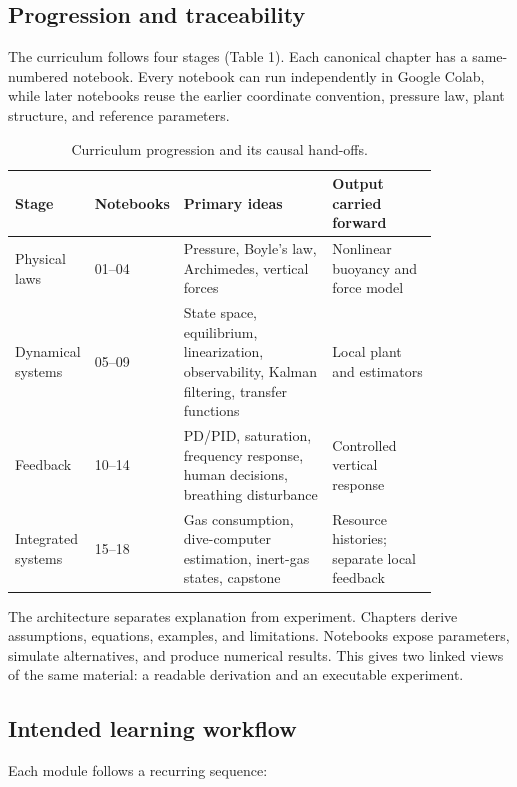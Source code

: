 \documentclass[
]{article}
\begin{document}
\hypertarget{progression-and-traceability}{%
\subsection{Progression and
traceability}\label{progression-and-traceability}}

The curriculum follows four stages (Table 1). Each canonical chapter has
a same-numbered notebook. Every notebook can run independently in Google
Colab, while later notebooks reuse the earlier coordinate convention,
pressure law, plant structure, and reference parameters.

\begin{table}[htbp]
\centering
\caption{Curriculum progression and its causal hand-offs.}
\small
\begin{tabular}{p{0.14\linewidth}p{0.10\linewidth}p{0.35\linewidth}p{0.25\linewidth}}
\toprule
Stage & Notebooks & Primary ideas & Output carried forward \\
\midrule
Physical laws & 01--04 & Pressure, Boyle's law, Archimedes, vertical forces & Nonlinear buoyancy and force model \\
Dynamical systems & 05--09 & State space, equilibrium, linearization, observability, Kalman filtering, transfer functions & Local plant and estimators \\
Feedback & 10--14 & PD/PID, saturation, frequency response, human decisions, breathing disturbance & Controlled vertical response \\
Integrated systems & 15--18 & Gas consumption, dive-computer estimation, inert-gas states, capstone & Resource histories; separate local feedback \\
\bottomrule
\end{tabular}
\end{table}

The architecture separates explanation from experiment. Chapters derive
assumptions, equations, examples, and limitations. Notebooks expose
parameters, simulate alternatives, and produce numerical results. This
gives two linked views of the same material: a readable derivation and
an executable experiment.

\hypertarget{intended-learning-workflow}{%
\subsection{Intended learning
workflow}\label{intended-learning-workflow}}

Each module follows a recurring sequence:
\end{document}
